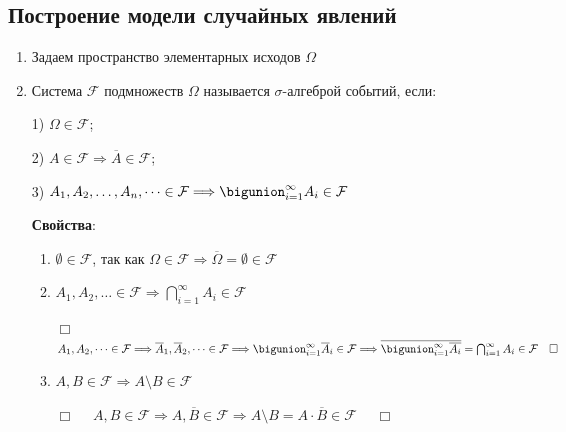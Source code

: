 \documentclass[12pt]{article}
\begin{document}

    \subsection{Построение модели случайных явлений}

    \begin{enumerate}
        \item Задаем пространство элементарных исходов $\Omega$

        \item \Defs Система $\mathcal{F}$ подмножеств $\Omega$ называется $\sigma$-алгеброй событий, если:

        1) $\Omega \in \mathcal{F}$;

        2) $A \in \mathcal{F} \Longrightarrow \overline{A} \in \mathcal{F}$;

        3) $A_1, A_2, \dots, A_n, \dots \in \mathcal{F} \Longrightarrow \bigunion_{i = 1}^\infty A_i \in \mathcal{F}$

        \textbf{Свойства}:

        \begin{enumerate}
            \item $\emptyset \in \mathcal{F}$, так как $\Omega \in \mathcal{F} \Longrightarrow \overline{\Omega} = \emptyset \in \mathcal{F}$

            \item $A_1, A_2, \dots \in \mathcal{F} \Longrightarrow \bigcap_{i = 1}^\infty A_i \in \mathcal{F}$

            \begin{tcolorbox}
                $\Box \quad$ $A_1, A_2, \dots \in \mathcal{F} \Longrightarrow
                \overline{A}_1, \overline{A}_2, \dots \in \mathcal{F} \Longrightarrow
                \bigunion_{i = 1}^\infty \overline{A}_i \in \mathcal{F} \Longrightarrow
                \overline{\bigunion_{i = 1}^\infty \overline{A_i}} = \bigcap_{i = 1}^\infty A_i \in \mathcal{F} \quad \Box$
            \end{tcolorbox}

            \item $A, B \in \mathcal{F} \Longrightarrow A \setminus B \in \mathcal{F}$

            \begin{tcolorbox}
                $\Box \quad$ $A, B \in \mathcal{F} \Longrightarrow A, \overline{B} \in \mathcal{F} \Longrightarrow A \setminus B = A \cdot \overline{B} \in \mathcal{F}$ $\quad \Box$
            \end{tcolorbox}


\end{enumerate}
\end{enumerate}
\end{document}
